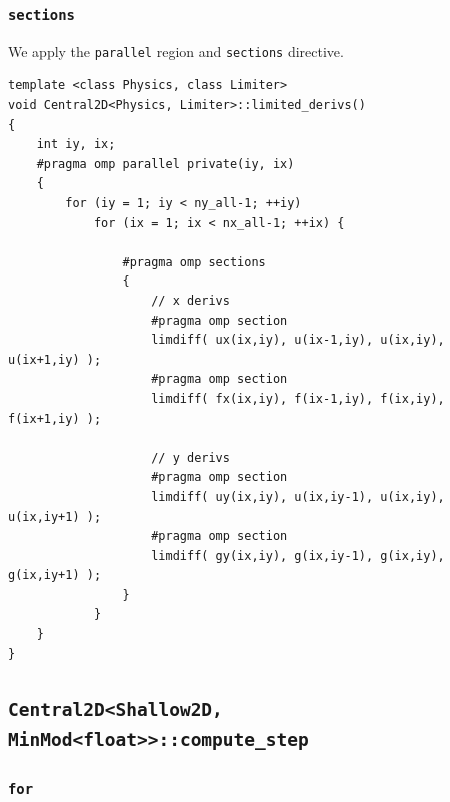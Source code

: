 \documentclass[12pt]{article}
\numberwithin{equation}{section}
\begin{document}
\subsubsection{\texttt{sections}}

We apply the \texttt{parallel} region and \texttt{sections} directive.
\begin{verbatim}
template <class Physics, class Limiter>
void Central2D<Physics, Limiter>::limited_derivs()
{
    int iy, ix;
    #pragma omp parallel private(iy, ix)
    {
        for (iy = 1; iy < ny_all-1; ++iy)
            for (ix = 1; ix < nx_all-1; ++ix) {

                #pragma omp sections
                {
                    // x derivs
                    #pragma omp section
                    limdiff( ux(ix,iy), u(ix-1,iy), u(ix,iy), u(ix+1,iy) );
                    #pragma omp section
                    limdiff( fx(ix,iy), f(ix-1,iy), f(ix,iy), f(ix+1,iy) );

                    // y derivs
                    #pragma omp section
                    limdiff( uy(ix,iy), u(ix,iy-1), u(ix,iy), u(ix,iy+1) );
                    #pragma omp section
                    limdiff( gy(ix,iy), g(ix,iy-1), g(ix,iy), g(ix,iy+1) );
                }
            }
    }
}
\end{verbatim}

\subsection{\texttt{Central2D<Shallow2D, MinMod<float>>::compute\_step}}

\subsubsection{\texttt{for}}
\end{document}

